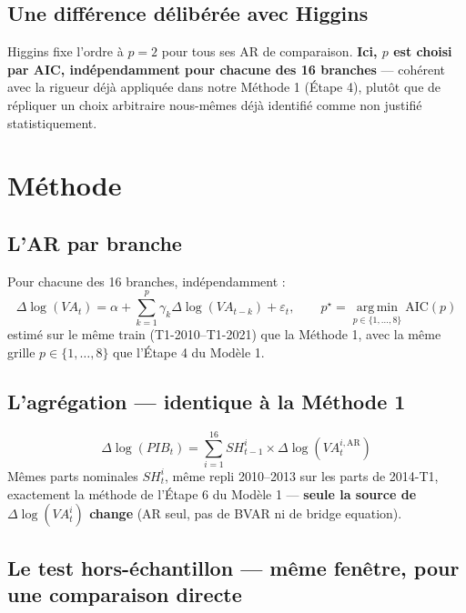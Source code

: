 \documentclass[11pt,a4paper]{article}
\begin{document}
\subsection{Une différence délibérée avec Higgins}

Higgins fixe l'ordre à $p=2$ pour tous ses AR de comparaison. \textbf{Ici, $p$ est choisi par AIC, indépendamment pour chacune des 16 branches} --- cohérent avec la rigueur déjà appliquée dans notre Méthode 1 (Étape 4), plutôt que de répliquer un choix arbitraire nous-mêmes déjà identifié comme non justifié statistiquement.

\section{Méthode}

\subsection{L'AR par branche}

Pour chacune des 16 branches, indépendamment :
\begin{equation}
\Delta\log(VA_t) = \alpha + \sum_{k=1}^{p}\gamma_k \Delta\log(VA_{t-k}) + \varepsilon_t, \qquad p^\star = \operatorname*{arg\,min}_{p\in\{1,\dots,8\}} \text{AIC}(p)
\end{equation}
estimé sur le même train (T1-2010--T1-2021) que la Méthode 1, avec la même grille $p\in\{1,\dots,8\}$ que l'Étape 4 du Modèle 1.

\subsection{L'agrégation --- identique à la Méthode 1}

\begin{equation}
\Delta\log(PIB_t) = \sum_{i=1}^{16} SH_{t-1}^i \times \Delta\log(VA_t^{i,\text{AR}})
\end{equation}
Mêmes parts nominales $SH_t^i$, même repli 2010--2013 sur les parts de 2014-T1, exactement la méthode de l'Étape 6 du Modèle 1 --- \textbf{seule la source de $\Delta\log(VA_t^i)$ change} (AR seul, pas de BVAR ni de bridge equation).

\subsection{Le test hors-échantillon --- même fenêtre, pour une comparaison directe}
\end{document}
